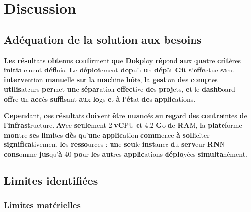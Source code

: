 \documentclass{rapportClass} %
\begin{document}
\chapter{Discussion}

\section{Adéquation de la solution aux besoins}

\textbf{Le}s \textbf{résul}tats \textbf{obte}nus \textbf{confi}rment \textbf{qu}e \textbf{Dokp}loy \textbf{rép}ond \textbf{au}x \textbf{qua}tre \textbf{crit}ères
\textbf{initia}lement \textbf{défi}nis. \textbf{L}e \textbf{déploi}ement \textbf{dep}uis \textbf{u}n \textbf{dép}ôt \textbf{Gi}t \textbf{s}'\textbf{effe}ctue
\textbf{sa}ns \textbf{interv}ention \textbf{manu}elle \textbf{su}r \textbf{l}a \textbf{mach}ine \textbf{hô}te, \textbf{l}a \textbf{gest}ion \textbf{de}s \textbf{comp}tes
\textbf{utilis}ateurs \textbf{per}met \textbf{un}e \textbf{sépar}ation \textbf{effec}tive \textbf{de}s \textbf{proj}ets, \textbf{e}t \textbf{l}e
\textbf{dashb}oard \textbf{off}re \textbf{u}n \textbf{acc}ès \textbf{suffi}sant \textbf{au}x \textbf{lo}gs \textbf{e}t \textbf{à} \textbf{l}'\textbf{ét}at \textbf{de}s
\textbf{applic}ations.

\textbf{Cepen}dant, \textbf{ce}s \textbf{résul}tats \textbf{doiv}ent \textbf{êt}re \textbf{nuan}cés \textbf{a}u \textbf{reg}ard \textbf{de}s \textbf{contra}intes
\textbf{d}e \textbf{l}'\textbf{infrast}ructure. \textbf{Av}ec \textbf{seule}ment 2 \textbf{vC}PU \textbf{e}t 4.2 \textbf{G}o \textbf{d}e \textbf{RA}M, \textbf{l}a
\textbf{plate}forme \textbf{mon}tre \textbf{se}s \textbf{limi}tes \textbf{dè}s \textbf{q}u'\textbf{un}e \textbf{applic}ation \textbf{comm}ence \textbf{à}
\textbf{solli}citer \textbf{significa}tivement \textbf{le}s \textbf{resso}urces : \textbf{un}e \textbf{seu}le \textbf{inst}ance \textbf{d}u
\textbf{serv}eur \textbf{RN}N \textbf{cons}omme \textbf{jus}qu'\textbf{à} 40%
\textbf{po}ur \textbf{le}s \textbf{aut}res \textbf{applic}ations \textbf{déplo}yées \textbf{simulta}nément.

\section{Limites identifiées}

\subsection{Limites matérielles}
\end{document}
